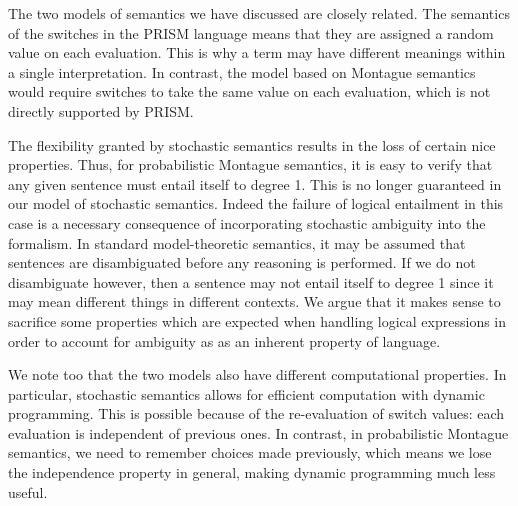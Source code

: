 \documentclass[11pt]{article}
\theoremstyle{definition}
\begin{document}
The two models of semantics we have discussed are closely
related.
The semantics
of the switches in the PRISM language means that they are assigned
a random value on each evaluation. This is why a term may have different meanings
within a single interpretation. In contrast, the model based on
Montague semantics would require switches to take the same value on
each evaluation, which is not directly supported by PRISM.

The flexibility granted by stochastic semantics results
in the loss of certain nice properties. Thus, for
probabilistic Montague semantics, it is easy to verify that any given sentence must entail itself to degree 1. This is
no longer guaranteed in our model of stochastic semantics. Indeed
the failure of logical entailment in this case is a necessary consequence of incorporating stochastic
ambiguity into the formalism. In standard model-theoretic semantics,
it may be assumed that sentences are disambiguated before any reasoning is
performed. If we do not disambiguate however, then a sentence may not entail itself to degree 1 since it may mean different things
in different contexts. We argue that it makes sense to
sacrifice some properties which are expected when handling logical
expressions in order to account for ambiguity as
as an inherent property of language.

We note too that the two models also have different computational properties.
In particular, stochastic semantics allows for efficient computation with dynamic
programming. This is possible because of the re-evaluation of switch
values: each evaluation is independent of previous ones. In contrast,
in probabilistic Montague semantics, we need to remember choices made
previously, which means we lose the independence property in general,
making dynamic programming much less useful. 




\end{document}
